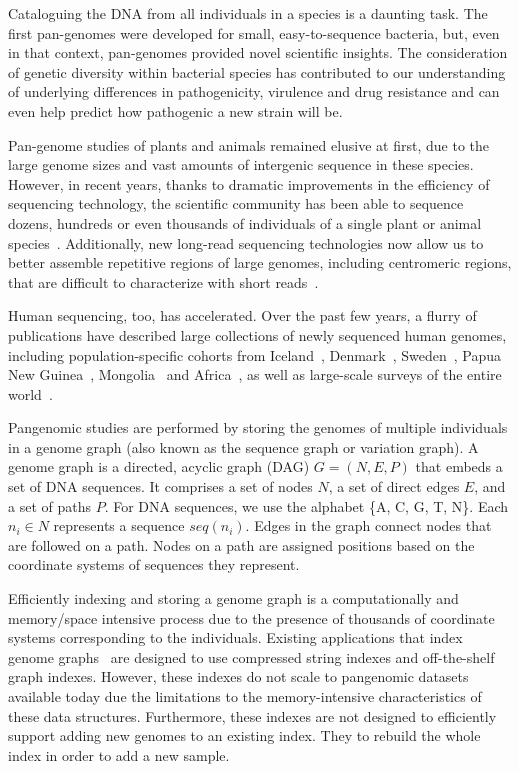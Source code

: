 Cataloguing the DNA from all individuals in a species is a daunting task. The first pan-genomes were developed for small, easy-to-sequence bacteria, but, even in that context, pan-genomes provided novel scientific insights. The consideration of genetic diversity within bacterial species has contributed to our understanding of underlying differences in pathogenicity, virulence and drug resistance and can even help predict how pathogenic a new strain will be.

Pan-genome studies of plants and animals remained elusive at first, due to the large genome sizes and vast amounts of intergenic sequence in these species. However, in recent years, thanks to dramatic improvements in the efficiency of sequencing technology, the scientific community has been able to sequence dozens, hundreds or even thousands of individuals of a single plant or animal species~\cite{XXX}. Additionally, new long-read sequencing technologies now allow us to better assemble repetitive regions of large genomes, including centromeric regions, that are difficult to characterize with short reads~\cite{XXX}.

Human sequencing, too, has accelerated. Over the past few years, a flurry of publications have described large collections of newly sequenced human genomes, including population-specific cohorts from Iceland~\cite{XXX}, Denmark~\cite{XXX}, Sweden~\cite{XXX}, Papua New Guinea~\cite{XXX}, Mongolia~\cite{XXX} and Africa~\cite{XXX}, as well as large-scale surveys of the entire world~\cite{XXX}.

Pangenomic studies are performed by storing the genomes of multiple individuals in a genome graph (also known as the sequence graph or variation graph). A genome graph is a directed, acyclic graph (DAG) $G = (N, E, P)$ that embeds a set of DNA sequences. It comprises a set of
nodes $N$, a set of direct edges $E$, and a set of paths $P$. For DNA sequences, we use the
alphabet \{A, C, G, T, N\}\@. Each $n_i \in N$ represents a sequence $seq(n_i)$. Edges in the graph connect nodes that are followed on a path. Nodes on a path
are assigned positions based on the coordinate systems of sequences they represent.

Efficiently indexing and storing a genome graph is a computationally and memory/space intensive process due to the presence of thousands of coordinate systems corresponding to the individuals. Existing applications that index genome graphs~\cite{pandey2021variantstore,garrison2018variation} are designed to use compressed string indexes and off-the-shelf graph indexes. However, these indexes do not scale to pangenomic datasets available today due the limitations to the memory-intensive characteristics of these data structures. Furthermore, these indexes are not designed to efficiently support adding new genomes to an existing index. They to rebuild the whole index in order to add a new sample.



